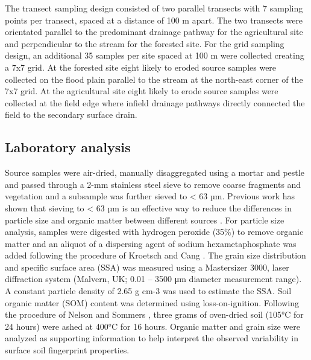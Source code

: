 \documentclass[
  number]{elsarticle}
\begin{document}
The transect sampling design consisted of two parallel transects with 7
sampling points per transect, spaced at a distance of 100 m apart. The
two transects were orientated parallel to the predominant drainage
pathway for the agricultural site and perpendicular to the stream for
the forested site. For the grid sampling design, an additional 35
samples per site spaced at 100 m were collected creating a 7x7 grid. At
the forested site eight likely to eroded source samples were collected
on the flood plain parallel to the stream at the north-east corner of
the 7x7 grid. At the agricultural site eight likely to erode source
samples were collected at the field edge where infield drainage pathways
directly connected the field to the secondary surface drain.

\subsection{Laboratory analysis}\label{laboratory-analysis}

Source samples were air-dried, manually disaggregated using a mortar and
pestle and passed through a 2-mm stainless steel sieve to remove coarse
fragments and vegetation and a subsample was further sieved to
\textless{} 63 µm. Previous work has shown that sieving to \textless{}
63 µm is an effective way to reduce the differences in particle size and
organic matter between different sources \citep{laceby2017}. For
particle size analysis, samples were digested with hydrogen peroxide
(35\%) to remove organic matter and an aliquot of a dispersing agent of
sodium hexametaphosphate was added following the procedure of Kroetsch
and Cang \citep{kroetsch2007}. The grain size distribution and specific
surface area (SSA) was measured using a Mastersizer 3000, laser
diffraction system (Malvern, UK; 0.01 -- 3500 μm diameter measurement
range). A constant particle density of 2.65 g cm-3 was used to estimate
the SSA. Soil organic matter (SOM) content was determined using
loss-on-ignition. Following the procedure of Nelson and Sommers
\citep{nelson1996}, three grams of oven-dried soil (105°C for 24 hours)
were ashed at 400°C for 16 hours. Organic matter and grain size were
analyzed as supporting information to help interpret the observed
variability in surface soil fingerprint properties.
\end{document}
